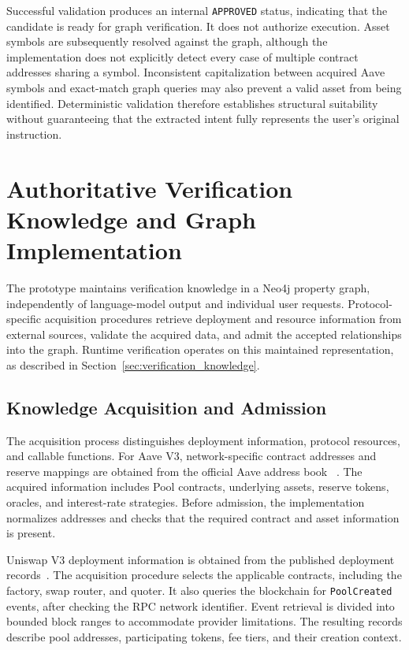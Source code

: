 Successful validation produces an internal
\texttt{APPROVED} status, indicating that the candidate
is ready for graph verification. It does not authorize
execution. Asset symbols are subsequently resolved against
the graph, although the implementation does not explicitly
detect every case of multiple contract addresses sharing
a symbol. Inconsistent capitalization between acquired
Aave symbols and exact-match graph queries may also prevent
a valid asset from being identified. Deterministic
validation therefore establishes structural suitability
without guaranteeing that the extracted intent fully
represents the user's original instruction.



\section{Authoritative Verification Knowledge and Graph Implementation}
\label{sec:verification_knowledge_implementation}

The prototype maintains verification knowledge in a Neo4j
property graph, independently of language-model output and
individual user requests. Protocol-specific acquisition
procedures retrieve deployment and resource information
from external sources, validate the acquired data, and
admit the accepted relationships into the graph. Runtime
verification operates on this maintained representation,
as described in Section~\ref{sec:verification_knowledge}.

\subsection{Knowledge Acquisition and Admission}

The acquisition process distinguishes deployment information,
protocol resources, and callable functions. For Aave V3,
network-specific contract addresses and reserve mappings are
obtained from the official Aave address book
~\cite{implAaveAddressBook}. The acquired information
includes Pool contracts, underlying assets, reserve tokens,
oracles, and interest-rate strategies. Before admission,
the implementation normalizes addresses and checks that
the required contract and asset information is present.

Uniswap V3 deployment information is obtained from the
published deployment records~\cite{implUniswapDeployments}.
The acquisition procedure selects the applicable contracts,
including the factory, swap router, and quoter. It also
queries the blockchain for \texttt{PoolCreated} events,
after checking the RPC network identifier. Event retrieval
is divided into bounded block ranges to accommodate provider
limitations. The resulting records describe pool addresses,
participating tokens, fee tiers, and their creation context.

